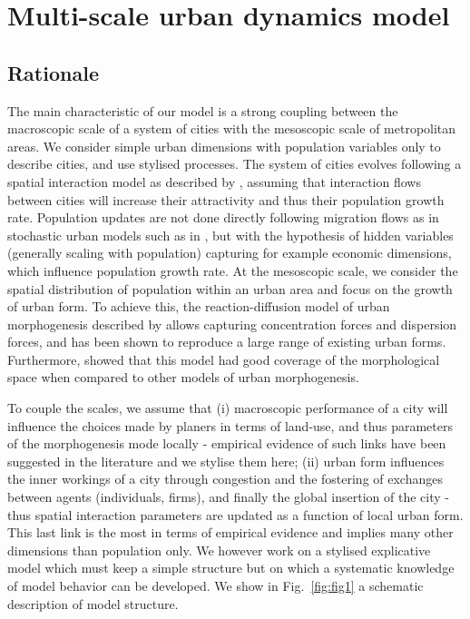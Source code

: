 \documentclass[ijgi,article,submit,moreauthors,pdftex]{Definitions/mdpi}
\begin{document}
\section{Multi-scale urban dynamics model}

\subsection{Rationale}


The main characteristic of our model is a strong coupling between the macroscopic scale of a system of cities with the mesoscopic scale of metropolitan areas. We consider simple urban dimensions with population variables only to describe cities, and use stylised processes. The system of cities evolves following a spatial interaction model as described by \cite{raimbault2020indirect}, assuming that interaction flows between cities will increase their attractivity and thus their population growth rate. Population updates are not done directly following migration flows as in stochastic urban models such as in \cite{james2018zipf}, but with the hypothesis of hidden variables (generally scaling with population) capturing for example economic dimensions, which influence population growth rate. At the mesoscopic scale, we consider the spatial distribution of population within an urban area and focus on the growth of urban form. To achieve this, the reaction-diffusion model of urban morphogenesis described by \cite{raimbault2018calibration} allows capturing concentration forces and dispersion forces, and has been shown to reproduce a large range of existing urban forms. Furthermore, \cite{raimbault2020comparison} showed that this model had good coverage of the morphological space when compared to other models of urban morphogenesis.

To couple the scales, we assume that (i) macroscopic performance of a city will influence the choices made by planers in terms of land-use, and thus parameters of the morphogenesis mode locally - empirical evidence of such links have been suggested in the literature \cite{joy2015toronto} and we stylise them here; (ii) urban form influences the inner workings of a city through congestion and the fostering of exchanges between agents (individuals, firms), and finally the global insertion of the city - thus spatial interaction parameters are updated as a function of local urban form. This last link is the most %
 in terms of empirical evidence and implies many other dimensions than population only. We however work on a stylised explicative model which must keep a simple structure but on which a systematic knowledge of model behavior can be developed. We show in Fig.~\ref{fig:fig1} a schematic description of model structure.
\end{document}
